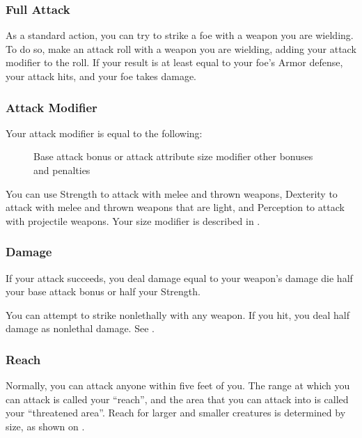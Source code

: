 \subsubsection{Full Attack}
As a standard action, you can try to strike a foe with a weapon you are wielding. To do so, make an attack roll with a weapon you are wielding, adding your attack modifier to the roll. If your result is at least equal to your foe's Armor defense, your attack hits, and your foe takes damage.

\subsubsection{Attack Modifier}
Your attack modifier is equal to the following:

\begin{figure}[h]
    \centering Base attack bonus or attack attribute  \add size modifier \add other bonuses and penalties
\end{figure}

You can use Strength to attack with melee and thrown weapons, Dexterity to attack with melee and thrown weapons that are light, and Perception to attack with projectile weapons. Your size modifier is described in .

\subsubsection{Damage}
If your attack succeeds, you deal damage equal to your weapon's damage die \add half your base attack bonus or half your Strength.

 You can attempt to strike nonlethally with any weapon. If you hit, you deal half damage as nonlethal damage. See .

\subsubsection{Reach}\label{Reach}
Normally, you can attack anyone within five feet of you. The range at which you can attack is called your ``reach'', and the area that you can attack into is called your ``threatened area''. Reach for larger and smaller creatures is determined by size, as shown on .

